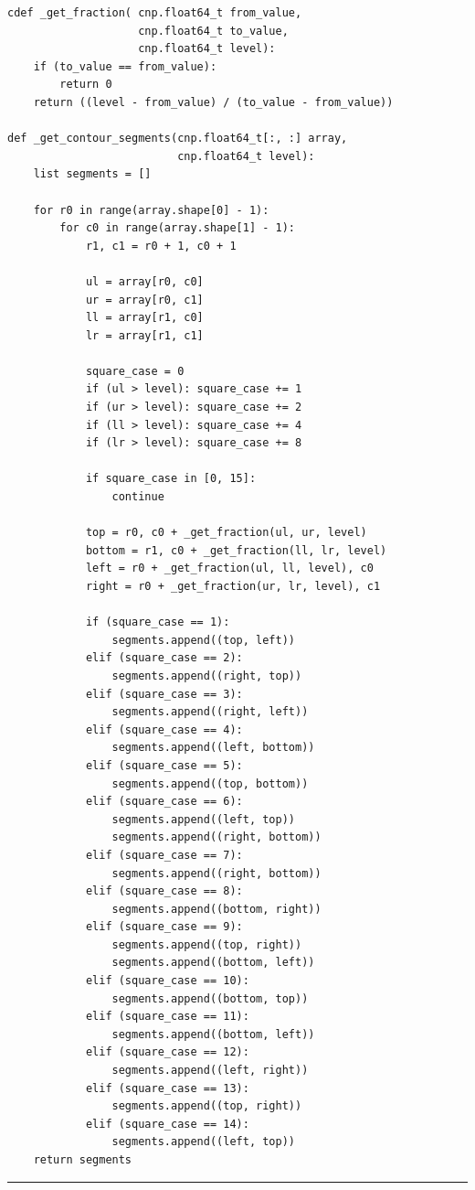 \documentclass[12pt,a4paper]{report}
\begin{document}
\begin{lstlisting}
cdef _get_fraction( cnp.float64_t from_value,
                    cnp.float64_t to_value,
                    cnp.float64_t level):
    if (to_value == from_value):
        return 0
    return ((level - from_value) / (to_value - from_value))

def _get_contour_segments(cnp.float64_t[:, :] array,
                          cnp.float64_t level):
    list segments = []

    for r0 in range(array.shape[0] - 1):
        for c0 in range(array.shape[1] - 1):
            r1, c1 = r0 + 1, c0 + 1
            
            ul = array[r0, c0]
            ur = array[r0, c1]
            ll = array[r1, c0]
            lr = array[r1, c1]

            square_case = 0
            if (ul > level): square_case += 1
            if (ur > level): square_case += 2
            if (ll > level): square_case += 4
            if (lr > level): square_case += 8

            if square_case in [0, 15]:
                continue

            top = r0, c0 + _get_fraction(ul, ur, level)
            bottom = r1, c0 + _get_fraction(ll, lr, level)
            left = r0 + _get_fraction(ul, ll, level), c0
            right = r0 + _get_fraction(ur, lr, level), c1

            if (square_case == 1):
                segments.append((top, left))
            elif (square_case == 2):
                segments.append((right, top))
            elif (square_case == 3):
                segments.append((right, left))
            elif (square_case == 4):
                segments.append((left, bottom))
            elif (square_case == 5):
                segments.append((top, bottom))
            elif (square_case == 6):
                segments.append((left, top))
                segments.append((right, bottom))
            elif (square_case == 7):
                segments.append((right, bottom))
            elif (square_case == 8):
                segments.append((bottom, right))
            elif (square_case == 9):
                segments.append((top, right))
                segments.append((bottom, left))
            elif (square_case == 10):
                segments.append((bottom, top))
            elif (square_case == 11):
                segments.append((bottom, left))
            elif (square_case == 12):
                segments.append((left, right))
            elif (square_case == 13):
                segments.append((top, right))
            elif (square_case == 14):
                segments.append((left, top))
    return segments
\end{lstlisting}
\noindent\rule[0.5ex]{\linewidth}{1pt} 
\newpage
\end{document}
